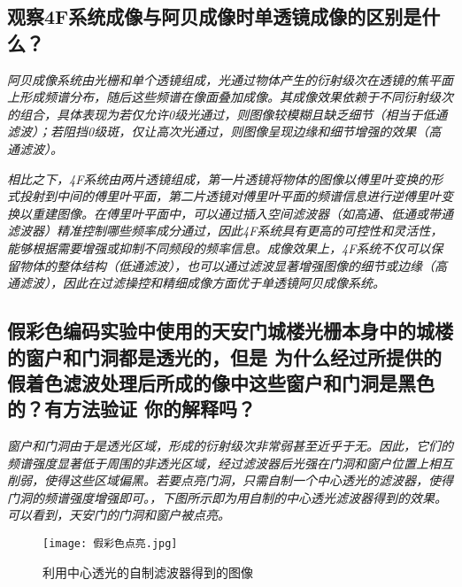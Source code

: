 \documentclass[UTF-8,twoside,cs4size]{ctexart}
\begin{document}
\subsection{观察4F系统成像与阿贝成像时单透镜成像的区别是什么？}
\textit{阿贝成像系统由光栅和单个透镜组成，光通过物体产生的衍射级次在透镜的焦平面上形成频谱分布，随后这些频谱在像面叠加成像。其成像效果依赖于不同衍射级次的组合，具体表现为若仅允许0级光通过，则图像较模糊且缺乏细节（相当于低通滤波）；若阻挡0级斑，仅让高次光通过，则图像呈现边缘和细节增强的效果（高通滤波）。}

\textit{相比之下，4F系统由两片透镜组成，第一片透镜将物体的图像以傅里叶变换的形式投射到中间的傅里叶平面，第二片透镜对傅里叶平面的频谱信息进行逆傅里叶变换以重建图像。在傅里叶平面中，可以通过插入空间滤波器（如高通、低通或带通滤波器）精准控制哪些频率成分通过，因此4F系统具有更高的可控性和灵活性，能够根据需要增强或抑制不同频段的频率信息。成像效果上，4F系统不仅可以保留物体的整体结构（低通滤波），也可以通过滤波显著增强图像的细节或边缘（高通滤波），因此在过滤操控和精细成像方面优于单透镜阿贝成像系统。}

\subsection{假彩色编码实验中使用的天安门城楼光栅本身中的城楼的窗户和门洞都是透光的，但是
为什么经过所提供的假着色滤波处理后所成的像中这些窗户和门洞是黑色的？有方法验证
你的解释吗？}
\textit{窗户和门洞由于是透光区域，形成的衍射级次非常弱甚至近乎于无。因此，它们的频谱强度显著低于周围的非透光区域，经过滤波器后光强在门洞和窗户位置上相互削弱，使得这些区域偏黑。若要点亮门洞，只需自制一个中心透光的滤波器，使得门洞的频谱强度增强即可。，下图所示即为用自制的中心透光滤波器得到的效果。可以看到，天安门的门洞和窗户被点亮。}
\begin{figure}[!h]
    \centering
    \texttt{[image: 假彩色点亮.jpg]}
    \caption{利用中心透光的自制滤波器得到的图像}
\end{figure}
\end{document}
